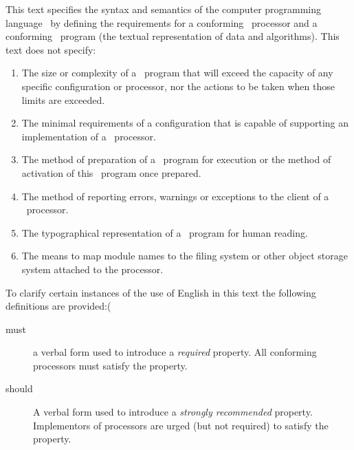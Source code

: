 \begin{optDefinition}
This text specifies the syntax and semantics of the computer
programming language \eulisp\ by defining the requirements for a
conforming \eulisp\ processor and a conforming \eulisp\ program (the
textual representation of data and algorithms).
%
%
\noindent
This text does not specify:
\begin{enumerate}
    \item The size or complexity of a \eulisp\ program that will exceed the
    capacity of any specific configuration or processor, nor the actions to be
    taken when those limits are exceeded.
    \item The minimal requirements of a configuration that is capable of
    supporting an implementation of a \eulisp\ processor.
    \item The method of preparation of a \eulisp\ program for execution or the
    method of activation of this \eulisp\ program once prepared.
    \item The method of reporting errors, warnings or exceptions to the client
    of a \eulisp\ processor.
    \item The typographical representation of a \eulisp\ program for human
    reading.
    \item The means to map module names to the filing system or other object
    storage system attached to the processor.
\end{enumerate}
%
To clarify certain instances of the use of English in this text the following
definitions are provided:(
\begin{description}
    \item[must] a verbal form used to introduce a {\em required} property.  All
    conforming processors must satisfy the property.
    \item[should] A verbal form used to introduce a {\em strongly recommended}
    property.  Implementors of processors are urged (but not required) to
    satisfy the property.
\end{description}
\end{optDefinition}
